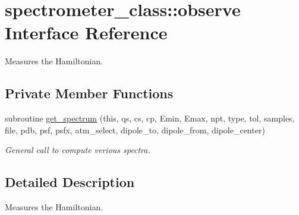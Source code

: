 \hypertarget{interfacespectrometer__class_1_1observe}{\section{spectrometer\+\_\+class\+:\+:observe Interface Reference}
\label{interfacespectrometer__class_1_1observe}
}


Measures the Hamiltonian.  


\subsection*{Private Member Functions}
\begin{DoxyCompactItemize}
\item 
subroutine \hyperlink{interfacespectrometer__class_1_1observe_ab17bdd571e63c8de9fb5029c8af31967}{get\+\_\+spectrum} (this, qs, cs, cp, Emin, Emax, npt, type, tol, samples, file, pdb, psf, psfx, atm\+\_\+select, dipole\+\_\+to, dipole\+\_\+from, dipole\+\_\+center)
\begin{DoxyCompactList}\small\item\em General call to compute verious spectra. \end{DoxyCompactList}\end{DoxyCompactItemize}


\subsection{Detailed Description}
Measures the Hamiltonian. 

